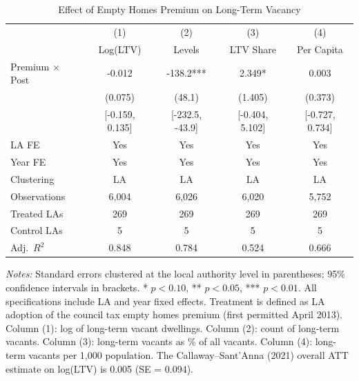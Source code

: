 \begin{table}[H]
\centering
\caption{Effect of Empty Homes Premium on Long-Term Vacancy}
\begin{threeparttable}
\begin{tabular}{lcccc}
\toprule
 & (1) & (2) & (3) & (4) \\
 & Log(LTV) & Levels & LTV Share & Per Capita \\
\midrule
Premium $\times$ Post & -0.012 & -138.2*** & 2.349* & 0.003 \\
 & (0.075) & (48.1) & (1.405) & (0.373) \\
 & [-0.159, 0.135] & [-232.5, -43.9] & [-0.404, 5.102] & [-0.727, 0.734] \\
\midrule
LA FE & Yes & Yes & Yes & Yes \\
Year FE & Yes & Yes & Yes & Yes \\
Clustering & LA & LA & LA & LA \\
Observations & 6,004 & 6,026 & 6,020 & 5,752 \\
Treated LAs & 269 & 269 & 269 & 269 \\
Control LAs & 5 & 5 & 5 & 5 \\
Adj.\ $R^2$ & 0.848 & 0.784 & 0.524 & 0.666 \\
\bottomrule
\end{tabular}
\begin{tablenotes}[flushleft]
\small
\item \emph{Notes:} Standard errors clustered at the local authority level in parentheses; 95\% confidence intervals in brackets. * $p<0.10$, ** $p<0.05$, *** $p<0.01$. All specifications include LA and year fixed effects. Treatment is defined as LA adoption of the council tax empty homes premium (first permitted April 2013). Column (1): log of long-term vacant dwellings. Column (2): count of long-term vacants. Column (3): long-term vacants as \% of all vacants. Column (4): long-term vacants per 1,000 population. The Callaway--Sant'Anna (2021) overall ATT estimate on log(LTV) is 0.005 (SE = 0.094).
\end{tablenotes}
\end{threeparttable}
\label{tab:main}
\end{table}

